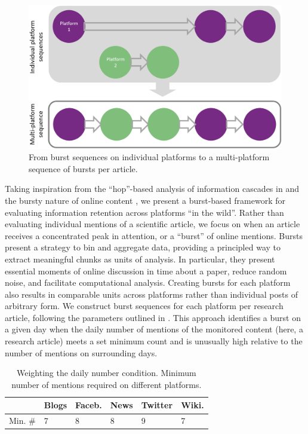 \documentclass[letterpaper]{article} %
\begin{document}
\begin{figure}[t]
\centering
\includegraphics[width=0.95\columnwidth]{figs/multiplatform_make_ex.png}
\caption{From burst sequences on individual platforms to a multi-platform sequence of bursts per article.}
\label{fig:burst_example}
\end{figure}

Taking inspiration from the ``hop''-based analysis of information cascades in \citet{ribeiroMessageDistortionInformation2019} and the bursty nature of online content \citep{zakhlebinDiffusionScientificArticles2020,gilbertWidespreadUnderprovisionReddit2013,chengCascadesRecur2016}, we present a burst-based framework for evaluating information retention across platforms ``in the wild''.
Rather than evaluating individual mentions of a scientific article, we focus on when an article receives a concentrated peak in attention, or a ``burst'' of online mentions. Bursts present a strategy to bin and aggregate data, providing a principled way to extract meaningful chunks as units of analysis.
In particular, they present essential moments of online discussion in time about a paper, reduce random noise, and facilitate computational analysis. Creating bursts for each platform also results in comparable units across platforms rather than individual posts of arbitrary form. We construct burst sequences for each platform per research article, following the parameters outlined in \citet{chengCascadesRecur2016}. This approach identifies a burst on a given day when the daily number of mentions of the monitored content (here, a research article) meets a set minimum count and is unusually high relative to the number of mentions on surrounding days.

\begin{table}[t]
\centering
\begin{tabular}{r|l|l|l|l|l}
& \textbf{Blogs} & \textbf{Faceb.} & \textbf{News} & \textbf{Twitter} & \textbf{Wiki.} \\
\hline
Min. \# & 7 & 8 & 8 & 9 & 7 \\
\end{tabular}
\caption{Weighting the daily number condition. Minimum number of mentions required on different platforms.}
\label{tab:condition_1_weights}
\end{table}
\end{document}
